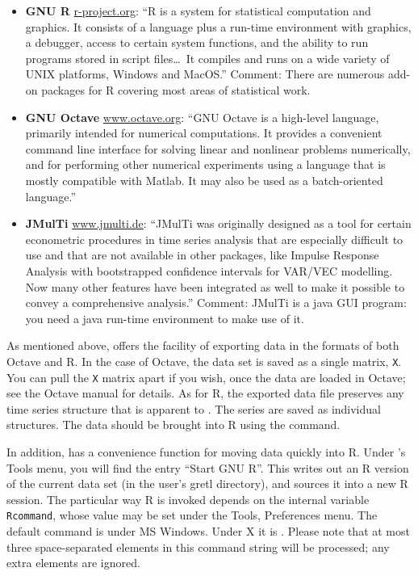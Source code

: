\begin{itemize}

\item \textbf{GNU R} \href{http://www.r-project.org/}{r-project.org}:
  ``R is a system for statistical computation and graphics. It
  consists of a language plus a run-time environment with graphics, a
  debugger, access to certain system functions, and the ability to run
  programs stored in script files\dots\ It compiles and runs on a wide
  variety of UNIX platforms, Windows and MacOS.''  Comment: There are
  numerous add-on packages for R covering most areas of statistical
  work.

\item \textbf{GNU Octave}
  \href{http://www.octave.org/}{www.octave.org}:
  ``GNU Octave is a high-level language, primarily intended for
  numerical computations. It provides a convenient command line
  interface for solving linear and nonlinear problems numerically, and
  for performing other numerical experiments using a language that is
  mostly compatible with Matlab. It may also be used as a
  batch-oriented language.''

\item \textbf{JMulTi} \href{http://www.jmulti.de/}{www.jmulti.de}:
  ``JMulTi was originally designed as a tool for certain econometric
  procedures in time series analysis that are especially difficult to
  use and that are not available in other packages, like Impulse
  Response Analysis with bootstrapped confidence intervals for VAR/VEC
  modelling. Now many other features have been integrated as well to
  make it possible to convey a comprehensive analysis.''  Comment:
  JMulTi is a java GUI program: you need a java run-time environment to
  make use of it.

\end{itemize}

As mentioned above,  offers the facility of exporting
data in the formats of both Octave and R.  In the case of Octave, the
 data set is saved as a single matrix, \verb+X+. You can
pull the \verb+X+ matrix apart if you wish, once the data are loaded
in Octave; see the Octave manual for details.  As for R, the exported
data file preserves any time series structure that is apparent to
.  The series are saved as individual structures. The data
should be brought into R using the  command.
  
In addition,  has a convenience function for moving data
quickly into R.  Under 's Tools menu, you will find the
entry ``Start GNU R''.  This writes out an R version of the current
 data set (in the user's gretl directory), and sources it
into a new R session.  The particular way R is invoked depends on the
internal  variable \verb+Rcommand+, whose value may be set
under the Tools, Preferences menu.  The default command is
 under MS Windows. Under X it is .
Please note that at most three space-separated elements in this
command string will be processed; any extra elements are ignored.

